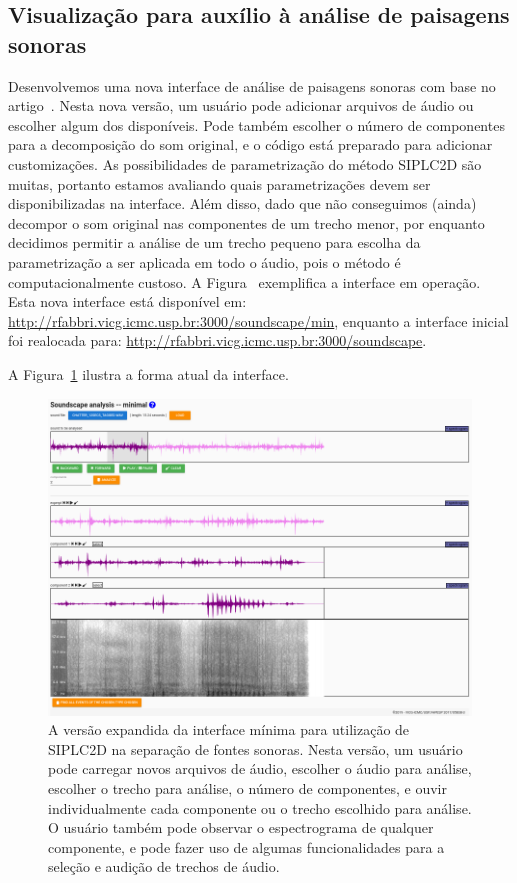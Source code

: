 \documentclass[a4paper, 11pt]{article}
\begin{document}
\subsection{Visualização para auxílio à análise de paisagens sonoras}\label{pa}
Desenvolvemos uma nova interface de análise de paisagens sonoras com base no
artigo~\cite{eld}.  
Nesta nova versão, um usuário pode adicionar arquivos de áudio ou escolher algum dos disponíveis.
Pode também escolher o número de componentes para a decomposição do som original,
e o código está preparado para adicionar customizações.
As possibilidades de parametrização do método SIPLC2D são muitas, portanto estamos avaliando quais
parametrizações devem ser disponibilizadas na interface.
Além disso, dado que não conseguimos (ainda) decompor o som original nas componentes de um
trecho menor, por enquanto decidimos permitir a análise de um trecho pequeno para escolha da
parametrização a ser aplicada em todo o áudio, pois o método é computacionalmente custoso.
A Figura~\cite{ps} exemplifica a interface em operação.
Esta nova interface está disponível em: \url{http://rfabbri.vicg.icmc.usp.br:3000/soundscape/min},
enquanto a interface inicial foi realocada para: \url{http://rfabbri.vicg.icmc.usp.br:3000/soundscape}.

A Figura~\ref{ss} ilustra a forma atual da interface.

\begin{figure}[h!]
\centering
  \includegraphics[width=0.8\linewidth]{ss}
\caption{%
  A versão expandida da interface mínima para utilização de SIPLC2D na separação de fontes sonoras.
  Nesta versão, um usuário pode carregar novos arquivos de áudio, escolher o áudio para análise,
  escolher o trecho para análise, o número de componentes, e ouvir individualmente cada componente
  ou o trecho escolhido para análise.
  O usuário também pode observar o espectrograma de qualquer componente, e pode fazer uso de algumas
  funcionalidades para a seleção e audição de trechos de áudio.
}\label{ss}
\end{figure}
\end{document}
